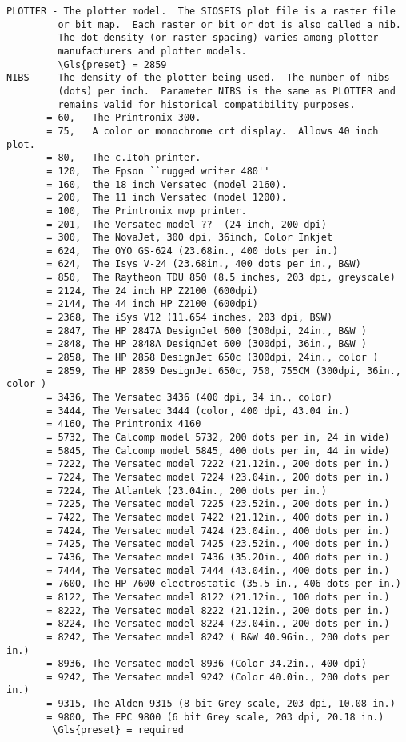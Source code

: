 \begin{verbatim}
PLOTTER - The plotter model.  The SIOSEIS plot file is a raster file
         or bit map.  Each raster or bit or dot is also called a nib.
         The dot density (or raster spacing) varies among plotter
         manufacturers and plotter models.
         \Gls{preset} = 2859
NIBS   - The density of the plotter being used.  The number of nibs
         (dots) per inch.  Parameter NIBS is the same as PLOTTER and
         remains valid for historical compatibility purposes.
       = 60,   The Printronix 300.
       = 75,   A color or monochrome crt display.  Allows 40 inch plot.
       = 80,   The c.Itoh printer.
       = 120,  The Epson ``rugged writer 480''
       = 160,  the 18 inch Versatec (model 2160).
       = 200,  The 11 inch Versatec (model 1200).
       = 100,  The Printronix mvp printer.
       = 201,  The Versatec model ??  (24 inch, 200 dpi)
       = 300,  The NovaJet, 300 dpi, 36inch, Color Inkjet
       = 624,  The OYO GS-624 (23.68in., 400 dots per in.)
       = 624,  The Isys V-24 (23.68in., 400 dots per in., B&W)
       = 850,  The Raytheon TDU 850 (8.5 inches, 203 dpi, greyscale)
       = 2124, The 24 inch HP Z2100 (600dpi)
       = 2144, The 44 inch HP Z2100 (600dpi)
       = 2368, The iSys V12 (11.654 inches, 203 dpi, B&W)
       = 2847, The HP 2847A DesignJet 600 (300dpi, 24in., B&W )
       = 2848, The HP 2848A DesignJet 600 (300dpi, 36in., B&W )
       = 2858, The HP 2858 DesignJet 650c (300dpi, 24in., color )
       = 2859, The HP 2859 DesignJet 650c, 750, 755CM (300dpi, 36in., color )
       = 3436, The Versatec 3436 (400 dpi, 34 in., color)
       = 3444, The Versatec 3444 (color, 400 dpi, 43.04 in.)
       = 4160, The Printronix 4160
       = 5732, The Calcomp model 5732, 200 dots per in, 24 in wide)
       = 5845, The Calcomp model 5845, 400 dots per in, 44 in wide)
       = 7222, The Versatec model 7222 (21.12in., 200 dots per in.)
       = 7224, The Versatec model 7224 (23.04in., 200 dots per in.)
       = 7224, The Atlantek (23.04in., 200 dots per in.)
       = 7225, The Versatec model 7225 (23.52in., 200 dots per in.)
       = 7422, The Versatec model 7422 (21.12in., 400 dots per in.)
       = 7424, The Versatec model 7424 (23.04in., 400 dots per in.)
       = 7425, The Versatec model 7425 (23.52in., 400 dots per in.)
       = 7436, The Versatec model 7436 (35.20in., 400 dots per in.)
       = 7444, The Versatec model 7444 (43.04in., 400 dots per in.)
       = 7600, The HP-7600 electrostatic (35.5 in., 406 dots per in.)
       = 8122, The Versatec model 8122 (21.12in., 100 dots per in.)
       = 8222, The Versatec model 8222 (21.12in., 200 dots per in.)
       = 8224, The Versatec model 8224 (23.04in., 200 dots per in.)
       = 8242, The Versatec model 8242 ( B&W 40.96in., 200 dots per in.)
       = 8936, The Versatec model 8936 (Color 34.2in., 400 dpi)
       = 9242, The Versatec model 9242 (Color 40.0in., 200 dots per in.)
       = 9315, The Alden 9315 (8 bit Grey scale, 203 dpi, 10.08 in.)
       = 9800, The EPC 9800 (6 bit Grey scale, 203 dpi, 20.18 in.)
        \Gls{preset} = required


\end{verbatim}
